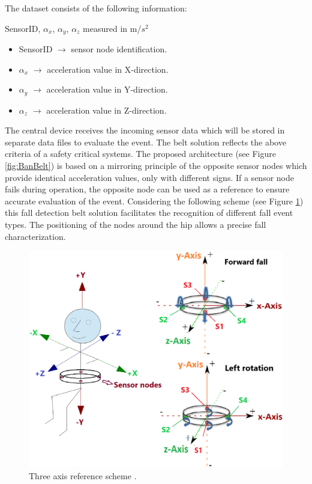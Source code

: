 \documentclass[10pt,journal,compsoc]{IEEEtran}
\begin{document}
The dataset consists of the following information: 
\begin{center}
	SensorID, $\alpha_{x}$, $\alpha_{y}$, $\alpha_{z}$ measured in m/$s^2$
\end{center}
\begin{itemize}
	\item SensorID $\rightarrow$ sensor node identification.
	\item $\alpha_{x}$ $\rightarrow$ acceleration value in X-direction.
	\item $\alpha_{y}$ $\rightarrow$ acceleration value in Y-direction.
	\item $\alpha_{z}$ $\rightarrow$ acceleration value in Z-direction.
\end{itemize} 
The central device receives the incoming sensor data which will be stored in separate data files to evaluate the event. 
The belt solution reflects the above criteria of a safety critical systems. The proposed architecture (see Figure \ref{fig:BanBelt}) is based on a mirroring principle of the opposite sensor nodes which provide identical acceleration values, only with different signs. If a sensor node fails during operation, the opposite node can be used as a reference to ensure accurate evaluation of the event.  Considering the following scheme (see Figure \ref{fig:ReferenceScheme}) this fall detection belt solution facilitates the recognition of different fall event types. The positioning of the nodes around the hip allows a precise fall characterization.
\begin{figure}[!ht]
	\centering
	\includegraphics[scale=0.19]{Images/axis.eps}
	\caption[Three axis reference scheme]{Three axis reference scheme \cite{LaBlunda.2016,LuigiMasterThesis}.}
	\label{fig:ReferenceScheme}
\end{figure}
\end{document}
